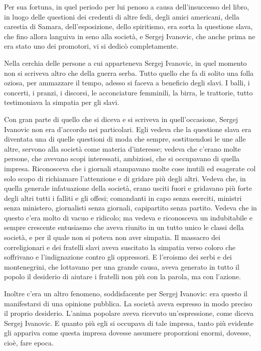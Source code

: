 Per sua fortuna, in quel periodo per lui penoso a causa dell'insuccesso del libro, in luogo delle questioni dei credenti di altre fedi, degli amici americani, della carestia di Samara, dell'esposizione, dello spiritismo, era sorta la questione slava, che fino allora languiva in seno alla società, e Sergej Ivanovic, che anche prima ne era stato uno dei promotori, vi si dedicò completamente. 

Nella cerchia delle persone a cui apparteneva Sergej Ivanovic, in quel momento non si scriveva altro che della guerra serba. Tutto quello che fa di solito una folla oziosa, per ammazzare il tempo, adesso si faceva a beneficio degli slavi. I balli, i concerti, i pranzi, i discorsi, le acconciature femminili, la birra, le trattorie, tutto testimoniava la simpatia per gli slavi. 

Con gran parte di quello che si diceva e si scriveva in quell'occasione, Sergej Ivanovic non era d'accordo nei particolari. Egli vedeva che la questione slava era diventata una di quelle questioni di moda che sempre, sostituendosi le une alle altre, servono alla società come materia d'interesse; vedeva che c'erano molte persone, che avevano scopi interessati, ambiziosi, che si occupavano di quella impresa. Riconosceva che i giornali stampavano molte cose inutili ed esagerate col solo scopo di richiamare l'attenzione e di gridare più degli altri. Vedeva che, in quella generale infatuazione della società, erano usciti fuori e gridavano più forte degli altri tutti i falliti e gli offesi; comandanti in capo senza eserciti, ministri senza ministero, giornalisti senza giornali, capipartito senza partito. Vedeva che in questo c'era molto di vacuo e ridicolo; ma vedeva e riconosceva un indubitabile e sempre crescente entusiasmo che aveva riunito in un tutto unico le classi della società, e per il quale non si poteva non aver simpatia. Il massacro dei correligionari e dei fratelli slavi aveva suscitato la simpatia verso coloro che soffrivano e l'indignazione contro gli oppressori. E l'eroismo dei serbi e dei montenegrini, che lottavano per una grande causa, aveva generato in tutto il popolo il desiderio di aiutare i fratelli non più con la parola, ma con l'azione. 

Inoltre c'era un altro fenomeno, soddisfacente per Sergej Ivanovic: era questo il manifestarsi di una opinione pubblica. La società aveva espresso in modo preciso il proprio desiderio. L'anima popolare aveva ricevuto un'espressione, come diceva Sergej Ivanovic. E quanto più egli si occupava di tale impresa, tanto più evidente gli appariva come questa impresa dovesse assumere proporzioni enormi, dovesse, cioè, fare epoca. 

